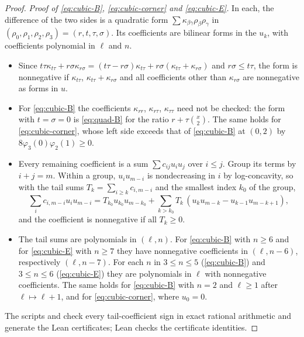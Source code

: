\begin{proof}
\emph{Proof of \eqref{eq:cubic-B}, \eqref{eq:cubic-corner} and \eqref{eq:cubic-E}.} In each, the difference of the two sides is a quadratic form $\sum\kappa_{\beta\gamma}\rho_\beta\rho_\gamma$ in $(\rho_0,\rho_1,\rho_2,\rho_3)=(r,t,\tau,\sigma)$. Its coefficients are bilinear forms in the $u_k$, with coefficients polynomial in $\ell$ and $n$.
\begin{itemize}
\item Since $t\tau\kappa_{t\tau}+r\sigma\kappa_{r\sigma}=(t\tau-r\sigma)\kappa_{t\tau}+r\sigma(\kappa_{t\tau}+\kappa_{r\sigma})$ and $r\sigma\leq t\tau$, the form is nonnegative if $\kappa_{t\tau}$, $\kappa_{t\tau}+\kappa_{r\sigma}$ and all coefficients other than $\kappa_{r\sigma}$ are nonnegative as forms in $u$.
\item For \eqref{eq:cubic-B} the coefficients $\kappa_{rr}$, $\kappa_{r\tau}$, $\kappa_{\tau\tau}$ need not be checked: the form with $t=\sigma=0$ is \eqref{eq:quad-B} for the ratio $r+\tau\binom x2$. The same holds for \eqref{eq:cubic-corner}, whose left side exceeds that of \eqref{eq:cubic-B} at $(0,2)$ by $8\varphi_3(0)\varphi_2(1)\geq0$.
\item Every remaining coefficient is a sum $\sum c_{ij}u_iu_j$ over $i\leq j$. Group its terms by $i+j=m$. Within a group, $u_iu_{m-i}$ is nondecreasing in $i$ by log-concavity, so with the tail sums $T_k=\sum_{i\geq k}c_{i,m-i}$ and the smallest index $k_0$ of the group,
\[
\sum_ic_{i,m-i}u_iu_{m-i}=T_{k_0}u_{k_0}u_{m-k_0}+\sum_{k>k_0}T_k\,(u_ku_{m-k}-u_{k-1}u_{m-k+1}),
\]
and the coefficient is nonnegative if all $T_k\geq0$.
\item The tail sums are polynomials in $(\ell,n)$. For \eqref{eq:cubic-B} with $n\geq6$ and for \eqref{eq:cubic-E} with $n\geq7$ they have nonnegative coefficients in $(\ell,n-6)$, respectively $(\ell,n-7)$. For each $n$ in $3\leq n\leq5$ (\eqref{eq:cubic-B}) and $3\leq n\leq6$ (\eqref{eq:cubic-E}) they are polynomials in $\ell$ with nonnegative coefficients. The same holds for \eqref{eq:cubic-B} with $n=2$ and $\ell\geq1$ after $\ell\mapsto\ell+1$, and for \eqref{eq:cubic-corner}, where $u_0=0$.
\end{itemize}
The scripts  and  check every tail-coefficient sign in exact rational arithmetic and generate the Lean certificates; Lean checks the certificate identities.


\end{proof}
